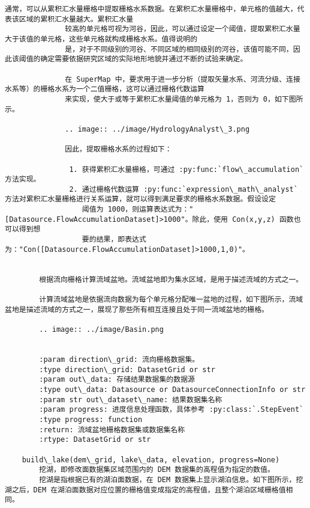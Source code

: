 \documentclass[11pt]{article}
\begin{document}
\begin{Verbatim}[commandchars=\\\{\}]
              通常，可以从累积汇水量栅格中提取栅格水系数据。在累积汇水量栅格中，单元格的值越大，代表该区域的累积汇水量越大。累积汇水量
              较高的单元格可视为河谷，因此，可以通过设定一个阈值，提取累积汇水量大于该值的单元格，这些单元格就构成栅格水系。值得说明的
              是，对于不同级别的河谷、不同区域的相同级别的河谷，该值可能不同，因此该阈值的确定需要依据研究区域的实际地形地貌并通过不断的试验来确定。
        
              在 SuperMap 中，要求用于进一步分析（提取矢量水系、河流分级、连接水系等）的栅格水系为一个二值栅格，这可以通过栅格代数运算
              来实现，使大于或等于累积汇水量阈值的单元格为 1，否则为 0，如下图所示。
        
              .. image:: ../image/HydrologyAnalyst\_3.png
        
              因此，提取栅格水系的过程如下：
        
               1. 获得累积汇水量栅格，可通过 :py:func:`flow\_accumulation` 方法实现。
               2. 通过栅格代数运算 :py:func:`expression\_math\_analyst` 方法对累积汇水量栅格进行关系运算，就可以得到满足要求的栅格水系数据。假设设定
                  阈值为 1000，则运算表达式为："[Datasource.FlowAccumulationDataset]>1000"。除此，使用 Con(x,y,z) 函数也可以得到想
                  要的结果，即表达式为："Con([Datasource.FlowAccumulationDataset]>1000,1,0)"。
        
        
        根据流向栅格计算流域盆地。流域盆地即为集水区域，是用于描述流域的方式之一。
        
        计算流域盆地是依据流向数据为每个单元格分配唯一盆地的过程，如下图所示，流域盆地是描述流域的方式之一，展现了那些所有相互连接且处于同一流域盆地的栅格。
        
        .. image:: ../image/Basin.png
        
        
        :param direction\_grid: 流向栅格数据集。
        :type direction\_grid: DatasetGrid or str
        :param out\_data: 存储结果数据集的数据源
        :type out\_data: Datasource or DatasourceConnectionInfo or str
        :param str out\_dataset\_name: 结果数据集名称
        :param progress: 进度信息处理函数，具体参考 :py:class:`.StepEvent`
        :type progress: function
        :return: 流域盆地栅格数据集或数据集名称
        :rtype: DatasetGrid or str
    
    build\_lake(dem\_grid, lake\_data, elevation, progress=None)
        挖湖，即修改面数据集区域范围内的 DEM 数据集的高程值为指定的数值。
        挖湖是指根据已有的湖泊面数据，在 DEM 数据集上显示湖泊信息。如下图所示，挖湖之后，DEM 在湖泊面数据对应位置的栅格值变成指定的高程值，且整个湖泊区域栅格值相同。
        

\end{Verbatim}
\end{document}
